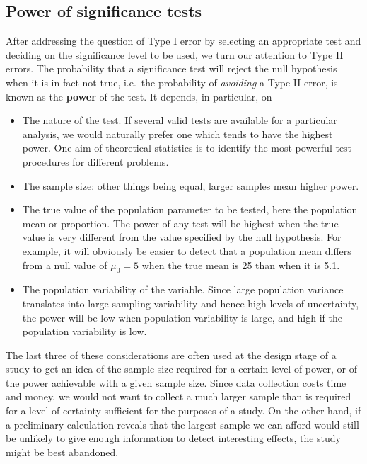 \documentclass[11pt,a4paper,openany]{book}
\begin{document}
\subsection{Power of significance tests}\label{ss-means-tests3-power}

After addressing the question of Type I error by selecting an
appropriate test and deciding on the significance level to be used, we
turn our attention to Type II errors. The probability that a
significance test will reject the null hypothesis when it is in fact not
true, i.e.~the probability of \emph{avoiding} a Type II error, is known
as the \textbf{power} of the test. It depends, in particular, on

\begin{itemize}
\item
  The nature of the test. If several valid tests are available for a
  particular analysis, we would naturally prefer one which tends to have
  the highest power. One aim of theoretical statistics is to identify
  the most powerful test procedures for different problems.
\item
  The sample size: other things being equal, larger samples mean higher
  power.
\item
  The true value of the population parameter to be tested, here the
  population mean or proportion. The power of any test will be highest
  when the true value is very different from the value specified by the
  null hypothesis. For example, it will obviously be easier to detect
  that a population mean differs from a null value of \(\mu_{0}=5\) when
  the true mean is 25 than when it is 5.1.
\item
  The population variability of the variable. Since large population
  variance translates into large sampling variability and hence high
  levels of uncertainty, the power will be low when population
  variability is large, and high if the population variability is low.
\end{itemize}

The last three of these considerations are often used at the design
stage of a study to get an idea of the sample size required for a
certain level of power, or of the power achievable with a given sample
size. Since data collection costs time and money, we would not want to
collect a much larger sample than is required for a level of certainty
sufficient for the purposes of a study. On the other hand, if a
preliminary calculation reveals that the largest sample we can afford
would still be unlikely to give enough information to detect interesting
effects, the study might be best abandoned.
\end{document}
